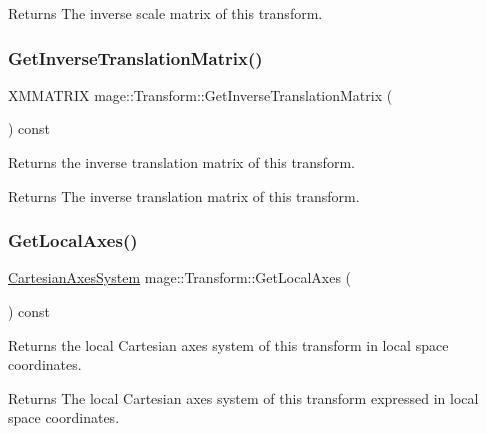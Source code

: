 \begin{DoxyReturn}{Returns}
The inverse scale matrix of this transform. 
\end{DoxyReturn}
\hypertarget{structmage_1_1_transform_a4cd7f7143c49772a83adfbd1d75dd475}{}\label{structmage_1_1_transform_a4cd7f7143c49772a83adfbd1d75dd475} 
\subsubsection{\texorpdfstring{Get\+Inverse\+Translation\+Matrix()}{GetInverseTranslationMatrix()}}
{\footnotesize\ttfamily X\+M\+M\+A\+T\+R\+IX mage\+::\+Transform\+::\+Get\+Inverse\+Translation\+Matrix (\begin{DoxyParamCaption}{ }\end{DoxyParamCaption}) const\hspace{0.3cm}{\ttfamily [private]}}

Returns the inverse translation matrix of this transform.

\begin{DoxyReturn}{Returns}
The inverse translation matrix of this transform. 
\end{DoxyReturn}
\hypertarget{structmage_1_1_transform_a84d2c6774dc1be15c2926bcc56856c7a}{}\label{structmage_1_1_transform_a84d2c6774dc1be15c2926bcc56856c7a} 
\subsubsection{\texorpdfstring{Get\+Local\+Axes()}{GetLocalAxes()}}
{\footnotesize\ttfamily \hyperlink{structmage_1_1_cartesian_axes_system}{Cartesian\+Axes\+System} mage\+::\+Transform\+::\+Get\+Local\+Axes (\begin{DoxyParamCaption}{ }\end{DoxyParamCaption}) const}

Returns the local Cartesian axes system of this transform in local space coordinates.

\begin{DoxyReturn}{Returns}
The local Cartesian axes system of this transform expressed in local space coordinates. 
\end{DoxyReturn}
\hypertarget{structmage_1_1_transform_af1db1f130cf15d7ec6c9a7a9f454dfe4}{}\label{structmage_1_1_transform_af1db1f130cf15d7ec6c9a7a9f454dfe4} 
